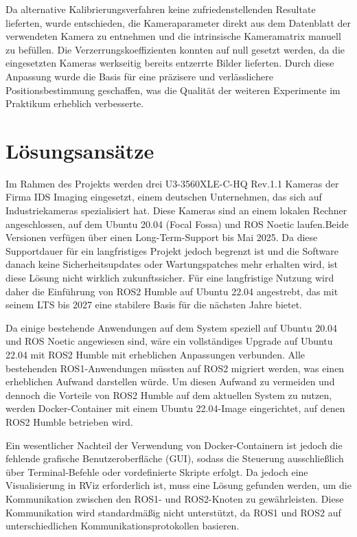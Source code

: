 \documentclass[ngerman]{article}    %
\theoremstyle{definition}
\begin{document}
Da alternative Kalibrierungsverfahren keine zufriedenstellenden Resultate lieferten, wurde entschieden, die Kameraparameter direkt aus dem Datenblatt der verwendeten Kamera zu entnehmen und die intrinsische Kameramatrix manuell zu befüllen. Die Verzerrungskoeffizienten konnten auf null gesetzt werden, da die eingesetzten Kameras werkseitig bereits entzerrte Bilder lieferten. Durch diese Anpassung wurde die Basis für eine präzisere und verlässlichere Positionsbestimmung geschaffen, was die Qualität der weiteren Experimente im Praktikum erheblich verbesserte.
\newpage

\section{Lösungsansätze}

Im Rahmen des Projekts werden drei U3-3560XLE-C-HQ Rev.1.1 Kameras der Firma IDS Imaging eingesetzt, einem deutschen Unternehmen, das sich auf Industriekameras spezialisiert hat. Diese Kameras sind an einem lokalen Rechner angeschlossen, auf dem Ubuntu 20.04 (Focal Fossa) und ROS Noetic laufen.Beide Versionen verfügen über einen Long-Term-Support bis Mai 2025. Da diese Supportdauer für ein langfristiges Projekt jedoch begrenzt ist und die Software danach keine Sicherheitsupdates oder Wartungspatches mehr erhalten wird, ist diese Lösung nicht wirklich zukunftssicher. Für eine langfristige Nutzung wird daher die Einführung von ROS2 Humble auf Ubuntu 22.04 angestrebt, das mit seinem LTS bis 2027 eine stabilere Basis für die nächsten Jahre bietet. 

Da einige bestehende Anwendungen auf dem System speziell auf Ubuntu 20.04 und ROS Noetic angewiesen sind, wäre ein vollständiges Upgrade auf Ubuntu 22.04 mit ROS2 Humble mit erheblichen Anpassungen verbunden. Alle bestehenden ROS1-Anwendungen müssten auf ROS2 migriert werden, was einen erheblichen Aufwand darstellen würde. Um diesen Aufwand zu vermeiden und dennoch die Vorteile von ROS2 Humble auf dem aktuellen System zu nutzen, werden Docker-Container mit einem Ubuntu 22.04-Image eingerichtet, auf denen ROS2 Humble betrieben wird. 

Ein wesentlicher Nachteil der Verwendung von Docker-Containern ist jedoch die fehlende grafische Benutzeroberfläche (GUI), sodass die Steuerung ausschließlich über Terminal-Befehle oder vordefinierte Skripte erfolgt. Da jedoch eine Visualisierung in RViz erforderlich ist, muss eine Lösung gefunden werden, um die Kommunikation zwischen den ROS1- und ROS2-Knoten zu gewährleisten. Diese Kommunikation wird standardmäßig nicht unterstützt, da ROS1 und ROS2 auf unterschiedlichen Kommunikationsprotokollen basieren.
\end{document}

